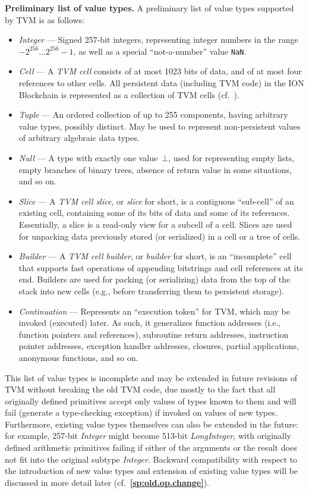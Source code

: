 \documentclass[12pt,oneside]{article}
\def\makepoint#1{\medbreak\noindent{\bf #1.\ }}
\def\nxsubpoint{\refstepcounter{subsubsection}%
  \smallbreak\makepoint{\thesubsubsection}}
\def\refpoint#1{{\rm\textbf{\ref{#1}}}}
\let\ptref=\refpoint
\def\emb#1{\textbf{#1.}}
\begin{document}
\nxsubpoint\label{sp:val.types}\emb{Preliminary list of value types}
A preliminary list of value types supported by TVM is as follows:
\begin{itemize}
\item {\em Integer\/} --- Signed 257-bit integers, representing integer numbers in the range $-2^{256}\ldots2^{256}-1$, as well as a special ``not-a-number'' value \texttt{NaN}.
\item {\em Cell\/} --- A {\em TVM cell\/} consists of at most 1023 bits of data, and of at most four references to other cells. All persistent data (including TVM code) in the ION Blockchain is represented as a collection of TVM cells (cf.~\cite[2.5.14]{ION}).
\item {\em Tuple\/} --- An ordered collection of up to 255 components, having arbitrary value types, possibly distinct. May be used to represent non-persistent values of arbitrary algebraic data types.
\item {\em Null\/} --- A type with exactly one value~$\bot$, used for representing empty lists, empty branches of binary trees, absence of return value in some situations, and so on.
\item {\em Slice\/} --- A {\em TVM cell slice}, or {\em slice\/} for short, is a contiguous ``sub-cell'' of an existing cell, containing some of its bits of data and some of its references. Essentially, a slice is a read-only view for a subcell of a cell. Slices are used for unpacking data previously stored (or serialized) in a cell or a tree of cells.
\item {\em Builder\/} --- A {\em TVM cell builder}, or {\em builder\/} for short, is an ``incomplete'' cell that supports fast operations of appending bitstrings and cell references at its end. Builders are used for packing (or serializing) data from the top of the stack into new cells (e.g., before transferring them to persistent storage).
\item {\em Continuation\/} --- Represents an ``execution token'' for TVM, which may be invoked (executed) later. As such, it generalizes function addresses (i.e., function pointers and references), subroutine return addresses, instruction pointer addresses, exception handler addresses, closures, partial applications, anonymous functions, and so on.
\end{itemize}
This list of value types is incomplete and may be extended in future revisions of TVM without breaking the old TVM code, due mostly to the fact that all originally defined primitives accept only values of types known to them and will fail (generate a type-checking exception) if invoked on values of new types. Furthermore, existing value types themselves can also be extended in the future: for example, 257-bit {\em Integer\/} might become 513-bit {\em LongInteger\/}, with originally defined arithmetic primitives failing if either of the arguments or the result does not fit into the original subtype {\em Integer}. Backward compatibility with respect to the introduction of new value types and extension of existing value types will be discussed in more detail later (cf.~\ptref{sp:old.op.change}).
\end{document}
